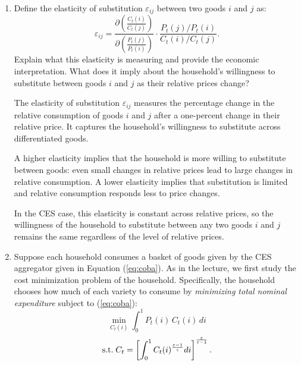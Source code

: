 \documentclass[dvipsnames,11pt]{article}
\begin{document}
        \begin{enumerate}
            \item Define the elasticity of substitution \( \varepsilon_{ij} \) between two goods \( i \) and \( j \) as:
            \[
            \varepsilon_{ij} = \frac{\partial \left( \frac{C_t(i)}{C_t(j)} \right)}{\partial \left( \frac{P_t(j)}{P_t(i)} \right)} \cdot \frac{P_t(j)/P_t(i)}{C_t(i)/C_t(j)}.
            \]
            Explain what this elasticity is measuring and provide the economic interpretation. What does it imply about the household’s willingness to substitute between goods \( i \) and \( j \) as their relative prices change?


                \begin{solution}

The elasticity of substitution $\varepsilon_{ij}$ measures the percentage change in the relative consumption of goods $i$ and $j$ after a one-percent change in their relative price. It captures the household's willingness to substitute across differentiated goods. 

A higher elasticity implies that the household is more willing to substitute between goods: even small changes in relative prices lead to large changes in relative consumption. A lower elasticity implies that substitution is limited and relative consumption responds less to price changes.

In the CES case, this elasticity is constant across relative prices, so the willingness of the household to substitute between any two goods \( i \) and \( j \) remains the same regardless of the level of relative prices.
                
                    
                \end{solution}
        
            \item Suppose each household consumes a basket of goods given by the CES aggregator given in Equation (\ref{eq:coba}). As in the lecture, we first study the cost minimization problem of the household. Specifically, the household chooses how much of each variety to consume by \textit{minimizing total nominal expenditure} subject to (\ref{eq:coba}):
            \begin{equation*}
            \min_{C_{t}(i)}\int_{0}^{1}P_{t}(i)\,C_{t}(i)\,di
            \end{equation*}
            \begin{equation*}
            \mathrm{s.t.}\;
            C_t = \left[ \int_{0}^{1}C_{t}(i)^{\frac{\varepsilon -1}{\varepsilon }}di\right] ^{%
            \frac{\varepsilon }{\varepsilon -1}}.
            \end{equation*}


\end{enumerate}
\end{document}
